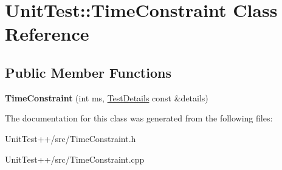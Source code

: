 \hypertarget{classUnitTest_1_1TimeConstraint}{\section{Unit\-Test\-:\-:Time\-Constraint Class Reference}
\label{classUnitTest_1_1TimeConstraint}
}
\subsection*{Public Member Functions}
\begin{DoxyCompactItemize}
\item 
\hypertarget{classUnitTest_1_1TimeConstraint_ad5d0218240ae8cf49893ff57a967b25b}{{\bfseries Time\-Constraint} (int ms, \hyperlink{classUnitTest_1_1TestDetails}{Test\-Details} const \&details)}\label{classUnitTest_1_1TimeConstraint_ad5d0218240ae8cf49893ff57a967b25b}

\end{DoxyCompactItemize}


The documentation for this class was generated from the following files\-:\begin{DoxyCompactItemize}
\item 
Unit\-Test++/src/Time\-Constraint.\-h\item 
Unit\-Test++/src/Time\-Constraint.\-cpp\end{DoxyCompactItemize}
